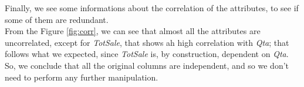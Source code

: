 Finally, we see some informations about the correlation of the attributes, to see if some of them are redundant.\\
From the Figure \ref{fig:corr}, we can see that almost all the attributes are uncorrelated, except for \emph{TotSale}, that shows ah high correlation with \emph{Qta}; that follows what we expected, since \emph{TotSale} is, by construction, dependent on \emph{Qta}. So, we conclude that all the original columns are independent, and so we don't need to perform any further manipulation.
